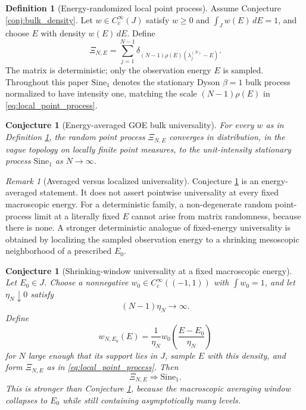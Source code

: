 \documentclass[11pt]{amsart}
\numberwithin{equation}{section}
\theoremstyle{plain}
\newtheorem{conjecture}[theorem]{Conjecture}
\theoremstyle{definition}
\newtheorem{definition}[theorem]{Definition}
\theoremstyle{remark}
\newtheorem{remark}[theorem]{Remark}
\begin{document}
\begin{definition}[Energy-randomized local point process]
\label{def:energy_randomized_process}
Assume Conjecture \ref{conj:bulk_density}.  Let $w\in C_c^\infty(J)$ satisfy $w\ge0$ and $\int_Jw(E)\,dE=1$, and choose $E$ with density $w(E)\,dE$.  Define
\begin{equation}
\Xi_{N,E}
=
\sum_{j=1}^{N-1}
\delta_{(N-1)\rho(E)(\lambda_j^{(N)}-E)}.
\label{eq:local_point_process}
\end{equation}
The matrix is deterministic; only the observation energy $E$ is sampled.  Throughout this paper $\mathrm{Sine}_1$ denotes the stationary Dyson $\beta=1$ bulk process normalized to have intensity one, matching the scale $(N-1)\rho(E)$ in \eqref{eq:local_point_process}.
\end{definition}

\begin{conjecture}[Energy-averaged GOE bulk universality]
\label{conj:goe_bulk_universality}
For every $w$ as in Definition \ref{def:energy_randomized_process}, the random point process $\Xi_{N,E}$ converges in distribution, in the vague topology on locally finite point measures, to the unit-intensity stationary process $\mathrm{Sine}_1$ as $N\to\infty$.
\end{conjecture}

\begin{remark}[Averaged versus localized universality]
\label{rem:averaged_vs_fixed_energy}
Conjecture \ref{conj:goe_bulk_universality} is an energy-averaged statement.  It does not assert pointwise universality at every fixed macroscopic energy.  For a deterministic family, a non-degenerate random point-process limit at a literally fixed $E$ cannot arise from matrix randomness, because there is none.  A stronger deterministic analogue of fixed-energy universality is obtained by localizing the sampled observation energy to a shrinking mesoscopic neighborhood of a prescribed $E_0$.
\end{remark}

\begin{conjecture}[Shrinking-window universality at a fixed macroscopic energy]
\label{conj:fixed_energy_goe}
Let $E_0\in J$.  Choose a nonnegative $w_0\in C_c^\infty((-1,1))$ with $\int w_0=1$, and let $\eta_N\downarrow0$ satisfy
\begin{equation}
(N-1)\eta_N\longrightarrow\infty.
\label{eq:mesoscopic_window_condition}
\end{equation}
Define
\begin{equation}
w_{N,E_0}(E)=\frac1{\eta_N}w_0\!\left(\frac{E-E_0}{\eta_N}\right)
\end{equation}
for $N$ large enough that its support lies in $J$, sample $E$ with this density, and form $\Xi_{N,E}$ as in \eqref{eq:local_point_process}.  Then
\begin{equation}
\Xi_{N,E}\Longrightarrow \mathrm{Sine}_1.
\label{eq:fixed_energy_sine1}
\end{equation}
This is stronger than Conjecture \ref{conj:goe_bulk_universality}, because the macroscopic averaging window collapses to $E_0$ while still containing asymptotically many levels.
\end{conjecture}
\end{document}
